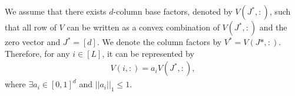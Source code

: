 \begin{assumption}
\label{assm:1}
We assume that there exists $d$-column base factors, denoted by $V(J^*,:)$, such that all row of $V$ can be written as a convex combination of $V(J^*,:)$ and the zero vector and $J^* = [d]$. We denote the column factors by $V^* = V(J*,:)$. Therefore, for any $i\in [L]$, it can be represented by
\begin{align*}
V(i,:) = a_i V(J^*,:) , 
\end{align*}
where $\exists a_i\in [0,1]^{d}$ and $ ||a_i||_1 \leq 1$.
\end{assumption}